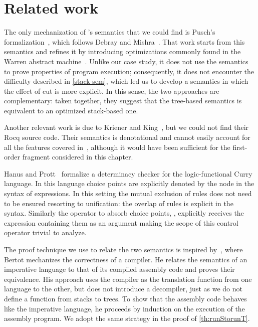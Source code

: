 \section{Related work}

The only mechanization of \prolog's semantics that we could find is
Pusch's \isabelle formalization~\cite{pusch1996}, which follows
 Debray and Mishra~\cite[Sec.~4.3]{debray1988}.
That work starts from this semantics and refines it by introducing
optimizations commonly found in the Warren abstract
machine~\cite{warren1983,ait1991-wam}. Unlike our case study,
it does not use the semantics to prove properties of program execution;
consequently, it does not encounter the difficulty described in
\cref{stack-sem}, which led us to develop a semantics in which the
effect of cut is more explicit. In this sense, the two approaches are
complementary: taken together, they suggest that the tree-based
semantics is equivalent to an optimized stack-based one.

Another relevant work is due to Kriener and King~\cite{king2011}, but
we could not find their Rocq source code. Their semantics is
denotational and cannot easily account for all the features covered
in~\cite{fissore2026}, although it would have been sufficient for the
first-order fragment considered in this chapter.

Hanus and Prott~\cite{hanus2025} formalize a determinacy checker for
the logic-functional Curry language. In this language choice points
are explicitly denoted by the  node in the syntax of expressions.
In this setting the mutual exclusion of rules does not need to be
ensured resorting to unification: the overlap of rules is explicit in the
syntax. Similarly the operator to absorb choice points, ,
explicitly receives the expression containing them as an argument making the
scope of this control operator trivial to analyze.

The proof technique we use to relate the two semantics is inspired
by~\cite{yves-equiv}, where Bertot mechanizes the correctness of a
compiler. He relates the semantics of an imperative language to that of
its compiled assembly code and proves their equivalence. His approach
uses the compiler as the translation function from one language to the
other, but does not introduce a decompiler, just as we do not define a
function from stacks to trees. To show that the assembly code behaves
like the imperative language, he proceeds by induction on the execution
of the assembly program. We adopt the same strategy in the proof of
\cref{th:runStorunT}.


